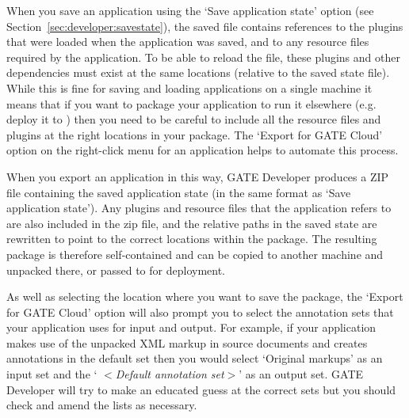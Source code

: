 
When you save an application using the `Save application state' option
(see Section~\ref{sec:developer:savestate}), the saved file contains references
to the plugins that were loaded when the application was saved, and to any
resource files required by the application.  To be able to reload the file,
these plugins and other dependencies must exist at the same locations
(relative to the saved state file).  While this is fine for saving and
loading applications on a single machine it means that if you want to
package your application to run it elsewhere (e.g. deploy it to 
) then
you need to be careful to include all the resource files and plugins at the
right locations in your package.  The `Export for GATE Cloud' option on the
right-click menu for an application helps to automate this process.

When you export an application in this way, GATE Developer produces a
ZIP file containing the saved application state (in the same format as
`Save application state').  Any plugins and resource files that the
application refers to are also included in the zip file, and the
relative paths in the saved state are rewritten to point to the
correct locations within the package.  The resulting package is
therefore self-contained and can be copied to another machine and
unpacked there, or passed to
 for deployment.

As well as selecting the location where you want to save the package,
the `Export for GATE Cloud' option will also prompt you to select the
annotation sets that your application uses for input and output.  For
example, if your application makes use of the unpacked XML markup in
source documents and creates annotations in the default set then you
would select `Original markups' as an input set and the `{\it
$<$Default annotation set$>$}' as an output set.  GATE Developer will
try to make an educated guess at the correct sets but you should check
and amend the lists as necessary.

